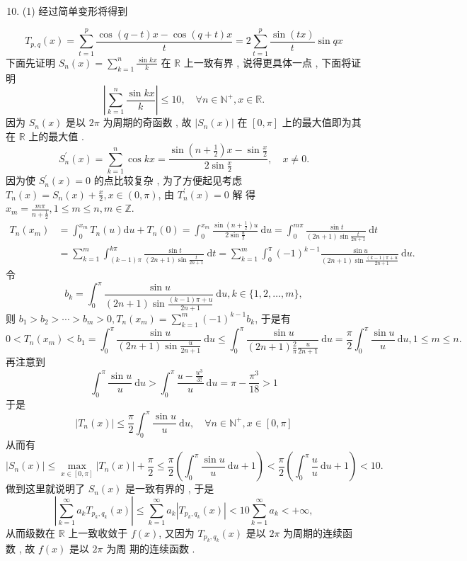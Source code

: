 \documentclass[10pt]{article}
\begin{document}
{\begin{enumerate}
  \setcounter{enumi}{9}
  \item (1)  经过简单变形将得到 
\end{enumerate}
$$
T_{p, q}(x)=\sum_{t=1}^{p} \frac{\cos (q-t) x-\cos (q+t) x}{t}=2 \sum_{t=1}^{p} \frac{\sin (t x)}{t} \sin q x
$$
 下面先证明  $S_{n}(x)=\sum_{k=1}^{n} \frac{\sin k x}{k}$  在  $\mathbb{R}$  上一致有界 ,  说得更具体一点 ,  下面将证明 
$$
\left|\sum_{k=1}^{n} \frac{\sin k x}{k}\right| \leqslant 10, \quad \forall n \in \mathbb{N}^{+}, x \in \mathbb{R} .
$$
 因为  $S_{n}(x)$  是以  $2 \pi$  为周期的奇函数 ,  故  $\left|S_{n}(x)\right|$  在  $[0, \pi]$  上的最大值即为其在  $\mathbb{R}$  上的最大值 .
$$
S_{n}^{\prime}(x)=\sum_{k=1}^{n} \cos k x=\frac{\sin \left(n+\frac{1}{2}\right) x-\sin \frac{x}{2}}{2 \sin \frac{x}{2}}, \quad x \neq 0 .
$$
 因为使  $S_{n}^{\prime}(x)=0$  的点比较复杂 ,  为了方便起见考虑  $T_{n}(x)=S_{n}(x)+\frac{x}{2}, x \in(0, \pi)$,  由  $T_{n}^{\prime}(x)=0$  解   得  $x_{m}=\frac{m \pi}{n+\frac{1}{2}}, 1 \leqslant m \leqslant n, m \in \mathbb{Z}$.
$$
\begin{aligned}
T_{n}\left(x_{m}\right) &=\int_{0}^{x_{m}} T_{n}(u) \mathrm{d} u+T_{n}(0)=\int_{0}^{x_{m}} \frac{\sin \left(n+\frac{1}{2}\right) u}{2 \sin \frac{u}{2}} \mathrm{~d} u=\int_{0}^{m \pi} \frac{\sin t}{(2 n+1) \sin \frac{t}{2 n+1}} \mathrm{~d} t \\
&=\sum_{k=1}^{m} \int_{(k-1) \pi}^{k \pi} \frac{\sin t}{(2 n+1) \sin \frac{t}{2 n+1}} \mathrm{~d} t=\sum_{k=1}^{m} \int_{0}^{\pi}(-1)^{k-1} \frac{\sin u}{(2 n+1) \sin \frac{(k-1) \pi+u}{2 n+1}} \mathrm{~d} u .
\end{aligned}
$$
 令 
$$
b_{k}=\int_{0}^{\pi} \frac{\sin u}{(2 n+1) \sin \frac{(k-1) \pi+u}{2 n+1}} \mathrm{~d} u, k \in\{1,2, \ldots, m\},
$$
 则  $b_{1}>b_{2}>\cdots>b_{m}>0, T_{n}\left(x_{m}\right)=\sum_{k=1}^{m}(-1)^{k-1} b_{k}$,  于是有 
$$
0<T_{n}\left(x_{m}\right)<b_{1}=\int_{0}^{\pi} \frac{\sin u}{(2 n+1) \sin \frac{u}{2 n+1}} \mathrm{~d} u \leqslant \int_{0}^{\pi} \frac{\sin u}{(2 n+1) \frac{2}{\pi} \frac{u}{2 n+1}} \mathrm{~d} u=\frac{\pi}{2} \int_{0}^{\pi} \frac{\sin u}{u} \mathrm{~d} u, 1 \leqslant m \leqslant n .
$$
 再注意到 
$$
\int_{0}^{\pi} \frac{\sin u}{u} \mathrm{~d} u>\int_{0}^{\pi} \frac{u-\frac{u^{3}}{3 !}}{u} \mathrm{~d} u=\pi-\frac{\pi^{3}}{18}>1
$$
 于是 
$$
\left|T_{n}(x)\right| \leqslant \frac{\pi}{2} \int_{0}^{\pi} \frac{\sin u}{u} \mathrm{~d} u, \quad \forall n \in \mathbb{N}^{+}, x \in[0, \pi]
$$
 从而有 
$$
\left|S_{n}(x)\right| \leqslant \max _{x \in[0, \pi]}\left|T_{n}(x)\right|+\frac{\pi}{2} \leqslant \frac{\pi}{2}\left(\int_{0}^{\pi} \frac{\sin u}{u} \mathrm{~d} u+1\right)<\frac{\pi}{2}\left(\int_{0}^{\pi} \frac{u}{u} \mathrm{~d} u+1\right)<10 .
$$
 做到这里就说明了  $S_{n}(x)$  是一致有界的 ,  于是 
$$
\left|\sum_{k=1}^{\infty} a_{k} T_{p_{k}, q_{k}}(x)\right| \leqslant \sum_{k=1}^{\infty} a_{k}\left|T_{p_{k}, q_{k}}(x)\right|<10 \sum_{k=1}^{\infty} a_{k}<+\infty,
$$
 从而级数在  $\mathbb{R}$  上一致收敛于  $f(x)$,  又因为  $T_{p_{k}, q_{k}}(x)$  是以  $2 \pi$  为周期的连续函数 ,  故  $f(x)$  是以  $2 \pi$  为周   期的连续函数 .

}
\end{document}
